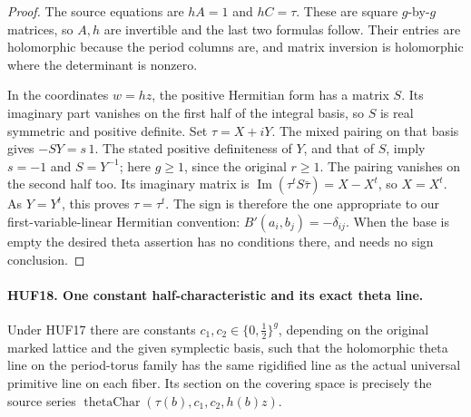 \begin{proof}
The source equations are \(hA=1\) and
\(hC=\tau\).  These are square \(g\)-by-\(g\)
matrices, so \(A,h\) are invertible and the
last two formulas follow.  Their entries are
holomorphic because the period columns are,
and matrix inversion is holomorphic where the
determinant is nonzero.

In the coordinates \(w=hz\), the positive
Hermitian form has a matrix \(S\).
Its imaginary part vanishes on the first half
of the integral basis, so \(S\) is real symmetric
and positive definite.  Set \(\tau=X+iY\).
The mixed pairing on that basis gives
\(-SY=s\,1\).  The stated positive definiteness
of \(Y\), and that of \(S\), imply \(s=-1\)
and \(S=Y^{-1}\); here \(g\geq1\), since the
original \(r\geq1\).  The pairing vanishes on
the second half too.  Its imaginary matrix is
\(\operatorname{Im}(\tau^tS\bar\tau)=X-X^t\),
so \(X=X^t\).  As \(Y=Y^t\), this proves
\(\tau=\tau^t\).
The sign is therefore the one appropriate to
our first-variable-linear Hermitian convention:
\(B'(a_i,b_j)=-\delta_{ij}\).
When the base is empty the desired theta
assertion has no conditions there, and needs
no sign conclusion.
\end{proof}

\paragraph{HUF18. One constant half-characteristic and its exact theta line.}
\label{claim:HUF18}
Under HUF17 there are constants
\(c_1,c_2\in\{0,\tfrac12\}^g\), depending on
the original marked lattice and the given
symplectic basis, such that the holomorphic
theta line on the period-torus family has
the same rigidified line as the actual
universal primitive line on each fiber.
Its section on the covering space is precisely
the source series
\(\operatorname{thetaChar}(\tau(b),c_1,c_2,h(b)z)\).

